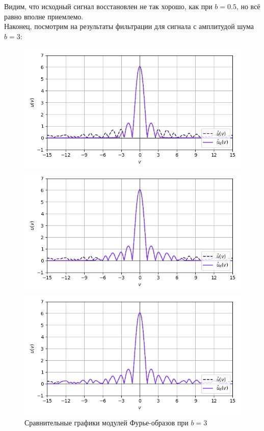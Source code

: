 \documentclass[a4paper]{article}
\begin{document}
Видим, что исходный сигнал восстановлен не так хорошо, как при $b = 0.5$, но всё равно вполне приемлемо.\\[0.5em]
Наконец, посмотрим на результаты фильтрации для сигнала с амплитудой шума $b = 3$:
\begin{figure}[H]
    \begin{minipage}{0.33\textwidth}
        \centering \includegraphics[width=\textwidth]{sources/low-pass filter/fourier (b=3, v=3).png}
        \caption{$v = 3$}
    \end{minipage}\hfill
    \begin{minipage}{0.33\textwidth}
        \centering \includegraphics[width=\textwidth]{sources/low-pass filter/fourier (b=3, v=7).png}
        \caption{$v = 7$}
    \end{minipage}\hfill
    \begin{minipage}{0.33\textwidth}
        \centering \includegraphics[width=\textwidth]{sources/low-pass filter/fourier (b=3, v=13).png}
        \caption{$v = 13$}
    \end{minipage}
    \caption*{Сравнительные графики модулей Фурье-образов при $b=3$}
\end{figure}
\end{document}
